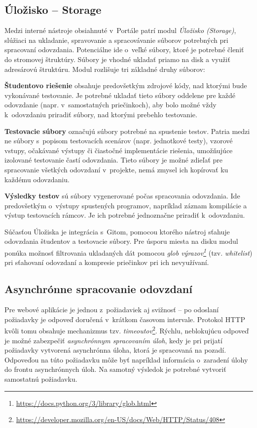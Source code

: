 \documentclass[
  digital, %
  oneside, %
  table,   %
  lof,     %
  lot,   %
]{fithesis3}
\newcommand*{\footurl}[1]{\footnote{\url{#1}}}
\begin{document}
\subsection{Úložisko -- Storage}

Medzi interné nástroje obsiahnuté v~Portále patrí modul \emph{Úložisko (Storage)}, slúžiaci na ukladanie, spravovanie a spracovávanie súborov potrebných pri spracovaní odovzdania. Potenciálne ide o~veľké súbory, ktoré je potrebné členiť do stromovej štruktúry. Súbory je vhodné ukladať priamo na disk a využiť adresárovú štruktúru. Modul rozlišuje tri základné druhy súborov: 

\textbf{Študentovo riešenie} obsahuje predovšetkým zdrojové kódy, nad ktorými bude vykonávané testovanie. Je potrebné ukladať tieto súbory oddelene pre každé odovzdanie (napr. v~samostatných priečinkoch), aby bolo možné vždy k~odovzdaniu priradiť súbory, nad ktorými prebehlo testovanie.

\textbf{Testovacie súbory} označujú súbory potrebné na spustenie testov. Patria medzi ne súbory s~popisom testovacích scenárov (napr. jednotkové testy), vzorové vstupy, očakávané výstupy či čiastočné implementácie riešenia, umožňujúce izolované testovanie častí odovzdania. Tieto súbory je možné zdieľať pre spracovanie všetkých odovzdaní v~projekte, nemá zmysel ich kopírovať ku každému odovzdaniu.

\textbf{Výsledky testov} sú súbory vygenerované počas spracovania odovzdania. Ide predovšetkým o~výstupy spustených programov, napríklad záznam kompilácie a výstup testovacích rámcov. Je ich potrebné jednoznačne priradiť k~odovzdaniu.

Súčasťou Úložiska je integrácia s~Gitom, pomocou ktorého nástroj sťahuje odovzdania študentov a testovacie súbory. Pre úsporu miesta na disku modul ponúka možnosť filtrovania ukladaných dát pomocou \emph{glob výrazov\footurl{https://docs.python.org/3/library/glob.html}} (tzv. \emph{whitelist}) pri sťahovaní odovzdaní a kompresie priečinkov pri ich nevyužívaní.

\subsection{Asynchrónne spracovanie odovzdaní}
\label{design-async-process}

Pre webové aplikácie je jednou z~požiadaviek aj svižnosť -- po odoslaní požiadavky je odpoveď doručená v~krátkom časovom intervale. Protokol HTTP\cite{RFC2616} kvôli tomu obsahuje mechanizmus tzv. \emph{timeoutov}\footurl{https://developer.mozilla.org/en-US/docs/Web/HTTP/Status/408}. Rýchlu, neblokujúcu odpoveď je možné zabezpečiť \emph{asynchrónnym spracovaním úloh}, kedy je pri prijatí požiadavky vytvorená asynchrónna úloha, ktorá je spracovaná na pozadí. Odpoveďou na túto požiadavku môže byť napríklad informácia o~zaradení úlohy do frontu asynchrónnych úloh. Na samotný výsledok je potrebné vytvoriť samostatnú požiadavku.
\end{document}
